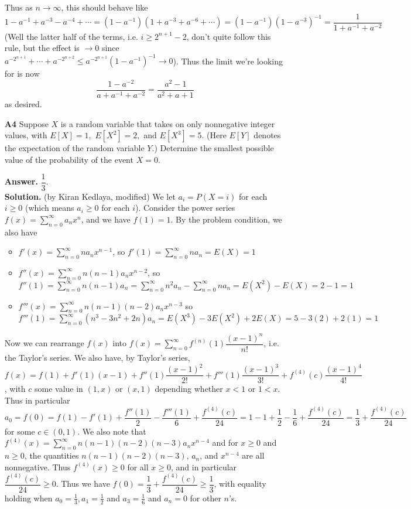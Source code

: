 \documentclass[11pt,a4paper]{article}
\newcommand{\<}{\langle}
\renewcommand{\>}{\rangle}
\begin{document}
\begin{enumerate}
\begin{itemize}
	\end{itemize}
    Thus as $n\to\infty$, this should behave like 
    \[
    1-a^{-1}+a^{-3}-a^{-4}+\cdots 
    =(1-a^{-1})(1+a^{-3}+a^{-6}+\cdots)
    =(1-a^{-1})(1-a^{-3})^{-1}
    =\frac{1}{1+a^{-1}+a^{-2}}
    \]
    (Well the latter half of the terms, i.e. $i\ge 2^{n+1}-2$, don't quite follow this rule, but the effect is $\to 0$ since $a^{-2^{n+1}}+\cdots + a^{-2^{n+2}}\le a^{-2^{n+1}}(1-a^{-1})^{-1}\to 0$). 
    Thus the limit we're looking for is now 
    \[
    \frac{1-a^{-2}}{a+a^{-1}+a^{-2}}=\frac{a^2-1}{a^2+a+1}
    \]
    as desired. 
	
	\item[\textbf{A4}] Suppose $X$ is a random variable that takes on only nonnegative integer values, with $E[X]=1,$ $E[X^2]=2,$ and $E[X^3]=5.$ (Here $E[Y]$ denotes the expectation of the random variable $Y.$) Determine the smallest possible value of the probability of the event $X=0.$
	
	\textbf{Answer.} $\dfrac 13$. \\
	\textbf{Solution.} (by Kiran Kedlaya, modified) We let $a_i=P(X=i)$ for each $i\ge 0$ (which means $a_i\ge 0$ for each $i$). Consider the power series $f(x)=\displaystyle\sum_{n=0}^{\infty}a_nx^n$, and we have $f(1)=1$. 
	By the problem condition, we also have 
	\begin{itemize}
		\item $f'(x)=\displaystyle\sum_{n=0}^{\infty}na_nx^{n-1}$, so $f'(1)=\displaystyle\sum_{n=0}^{\infty}na_n=E(X)=1$
		
		\item $f''(x)=\displaystyle\sum_{n=0}^{\infty}n(n-1)a_nx^{n-2}$, so
		$f''(1)=\displaystyle\sum_{n=0}^{\infty}n(n-1)a_n
		=\displaystyle\sum_{n=0}^{\infty}n^2a_n-\displaystyle\sum_{n=0}^{\infty}na_n
		=E(X^2)-E(X)
		=2-1=1
		$
		
		\item $f'''(x)=\displaystyle\sum_{n=0}^{\infty}n(n-1)(n-2)a_nx^{n-3}$ so 
		$f'''(1)=\displaystyle\sum_{n=0}^{\infty}(n^3-3n^2+2n)a_n
		=E(X^3)-3E(X^2)+2E(X)
		=5-3(2)+2(1)=1
		$
	\end{itemize}  
	Now we can rearrange $f(x)$ into $f(x)=\displaystyle\sum_{n=0}^{\infty} f^{(n)}(1)\dfrac{(x-1)^n}{n!}$, i.e. the Taylor's series. We also have, by Taylor's series, $f(x)=f(1)+f'(1)(x-1)+f''(1)\dfrac{(x-1)^2}{2!}+f'''(1)\dfrac{(x-1)^3}{3!}+f^{(4)}(c)\dfrac{(x-1)^4}{4!}$, with $c$ some value in $(1, x)$ or $(x, 1)$ depending whether $x<1$ or $1<x$. Thus in particular $a_0=f(0)=f(1)-f'(1)+\dfrac{f''(1)}{2}-\dfrac{f'''(1)}{6}+\dfrac{f^{(4)}(c)}{24}
	=1-1+\dfrac{1}{2}-\dfrac{1}{6}+\dfrac{f^{(4)}(c)}{24}
	=\dfrac{1}{3}+\dfrac{f^{(4)}(c)}{24}
	$
	for some $c\in (0, 1)$. 
	We also note that $f^{(4)}(x)=\displaystyle\sum_{n=0}^{\infty}n(n-1)(n-2)(n-3)a_nx^{n-4}$ and for $x\ge 0$ and $n\ge 0$, the quantities $n(n-1)(n-2)(n-3)$, $a_n$, and $x^{n-4}$ are all nonnegative. Thus $f^{(4)}(x)\ge 0$ for all $x\ge 0$, and in particular $\dfrac{f^{(4)}(c)}{24}\ge 0$. Thus we have $f(0)=\dfrac{1}{3}+\dfrac{f^{(4)}(c)}{24}\ge \dfrac 13$, with equality holding when $a_0=\frac 13, a_1=\frac 12$ and $a_3=\frac 16$ and $a_n=0$ for other $n$'s. 
	

\end{enumerate}
\end{document}
